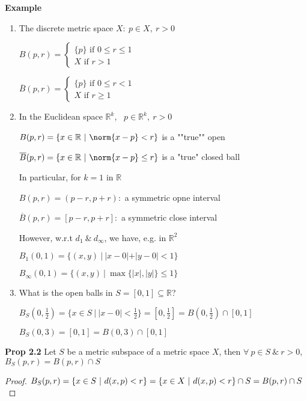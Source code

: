 \textbf{Example}$ $

\begin{enumerate}
	\item The discrete metric space $X:~ p \in X,~r>0$
	
	$B(p,r) = \begin{cases}
		\{p\} \text{ if } 0 \leq r \leq 1\\ X \text{ if } r > 1
	\end{cases}$
	
	$\overline{B}(p,r) = \begin{cases}
		\{p\} \text{ if } 0 \leq r < 1\\ X \text{ if } r \geq 1
	\end{cases}$
	
	\item In the Euclidean space $\mathbb R^k$,~ $p \in \mathbb R^k,~r>0$
	
	$B(p,r) = \{x \in \mathbb R~|~ \norm{x-p} < r \}$ is a ""true"" open
	
	$\overline{B}(p,r) = \{ x \in \mathbb R ~|~ \norm{x - p} \leq r \} $ is a "true" closed ball
	
	In particular, for $k = 1$ in $\mathbb R$
	
	$B(p,r) = (p-r,p+r):$ a symmetric opne interval
	
	$\overline{B}(p,r) = [p-r,p+r]:$ a symmetric close interval
	
	However, w.r.t $d_1 ~\&~ d_{\infty}$, we have, e.g. in $\mathbb R^2$
	
	$B_1(0,1) = \{(x,y)~|~|x-0|+|y-0|<1\}$
	
	$B_{\infty}(0,1) = \{(x,y) ~|~ \max\{|x|,|y|\} \leq 1\}$
	
	\item What is the open balls in $S = [0,1] \subseteq \mathbb R$?
	
	$B_S(0,\frac{1}{2}) = \{x \in S ~|~ |x - 0| < \frac{1}{2}\} = [0,\frac{1}{2}] = B(0,\frac{1}{2}) \cap [0,1]$
	
	$B_S(0,3) = [0,1] = B(0,3) \cap [0,1]$

\end{enumerate}

\textbf{Prop 2.2} Let $S$ be a metric subspace of a metric space $X$, then $\forall ~p \in S ~\&~ r > 0$, $B_S(p,r) = B(p,r) \cap S$

\begin{proof}
	$B_S(p,r) = \{x \in S ~|~ d(x,p) < r\} = \{x \in X ~|~ d(x,p) < r\} \cap S\\=B(p,r) \cap S$
\end{proof}

